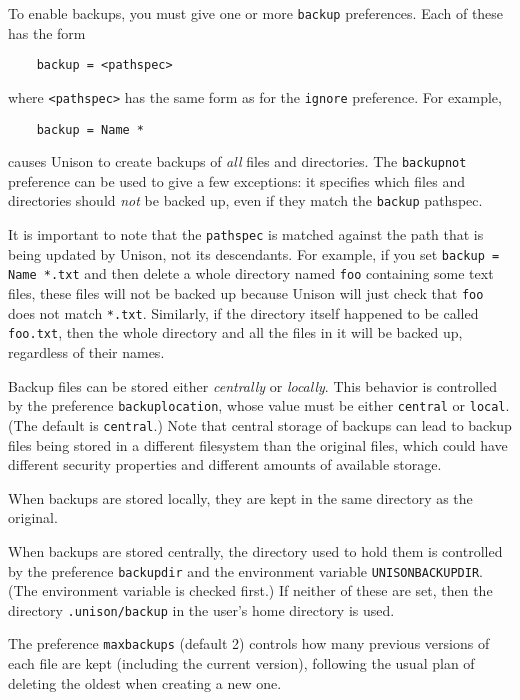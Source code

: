 \documentclass{article}
\begin{document}
To enable backups, you must give one or more \verb|backup| preferences.
Each of these has the form
\begin{verbatim}
    backup = <pathspec>
\end{verbatim}
where \verb|<pathspec>| has the same form as for the \verb|ignore|
preference.  For example,
\begin{verbatim}
    backup = Name *
\end{verbatim}
causes Unison to create backups of {\em all} files and directories.  The
\verb|backupnot| preference can be used to give a few exceptions: it
specifies which files and directories should {\em not} be backed up, even if
they match the \verb|backup| pathspec.

It is important to note that the \verb|pathspec| is matched against the path
that is being updated by Unison, not its descendants.  For example, if you
set \verb|backup = Name *.txt| and then delete a whole directory named
\verb|foo| containing some text files, these files will not be backed up
because Unison will just check that \verb|foo| does not match \verb|*.txt|.
Similarly, if the directory itself happened to be called \verb|foo.txt|,
then the whole directory and all the files in it will be backed up,
regardless of their names.

Backup files can be stored either {\em centrally} or {\em locally}.  This
behavior is controlled by the preference \verb|backuplocation|, whose value
must be either \verb|central| or \verb|local|.  (The default is
\verb|central|.)  Note that central storage of backups can lead to
backup files being stored in a different filesystem than the original
files, which could have different security properties and different
amounts of available storage.

When backups are stored locally, they are kept in the same
directory as the original.

When backups are stored centrally, the directory used to hold them is
controlled by the preference \verb|backupdir| and the
environment variable \verb|UNISONBACKUPDIR|.  (The environment variable is
checked first.)  If neither of these are set, then the directory
\verb|.unison/backup| in the user's home directory is used.

The preference \verb|maxbackups| (default 2) controls how many
previous versions of each file are kept (including the current
version), following the usual plan of deleting the oldest when
creating a new one.
\end{document}
